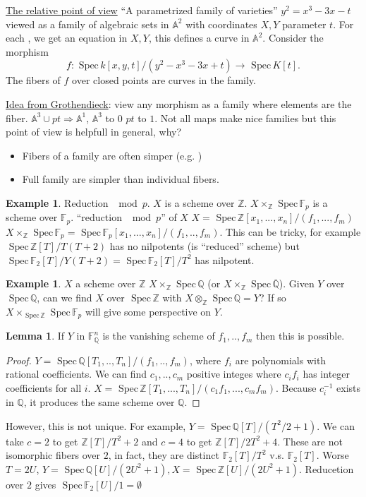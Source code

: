 \documentclass[11pt]{article}
\theoremstyle{definition}
\newtheorem{lemma}[thm]{Lemma}
\newtheorem{ex}[thm]{Example}
\newcommand{\spec}{\text{ Spec}\,}
\newcommand{\affn}{\mathbb A}
\newcommand{\intg}{\mathbb Z}
\newcommand{\bbf}{\mathbb F}
\newcommand{\ratl}{\mathbb Q}
\newcommand{\Lrta}{\Longrightarrow}
\newcommand{\lrta}{\longrightarrow}
\begin{document}
\underline{The relative point of view}
``A parametrized family of varieties''
$y^2=x^3-3x-t$ viewed as a family of algebraic sets in $\affn^2$ with coordinates $X,Y$ parameter $t$. For each %
, we get an equation in $X,Y$, this defines a curve in $\affn^2$. Consider the morphism
$$
f:\spec k[x,y,t]/(y^2-x^3-3x+t)\lrta \spec K[t].
$$
The fibers of $f$ over closed points are curves in the family.

\underline{Idea from Grothendieck}: view any morphism as a family where elements are the fiber. $\affn^3\cup pt\Lrta \affn^1$, $\affn^3$ to $0$ $pt$ to $1$. Not all maps make  nice families but this point of view is helpfull in general, why?
\begin{itemize}
	\item Fibers of a  family are often simper (e.g. )
	\item Full family are simpler than individual fibers.
\end{itemize}

\begin{ex}
Reduction $\mod p$. $X$ is a scheme over $\intg$. $X\times_\intg \spec \bbf_p$ is a scheme over $\bbf_p$. ``reduction $\mod p$'' of $X$
$X=\spec \intg[x_1,...,x_n]/(f_1,...,f_m)$
$X\times_\intg\spec \bbf_p=\spec \bbf_p[x_1,...,x_n]/(f_1,..,f_m)$. This can be tricky, for example $\spec \intg[T]/T(T+2)$ has no nilpotents (is ``reduced'' scheme) but $\spec \bbf_2[T]/Y(T+2)=\spec \bbf_2[T]/T^2$ has nilpotent. 
\end{ex}
\begin{ex}
$X$ a scheme over $\intg$
$X\times_\intg \spec \ratl$ (or $X\times_\intg \spec \overline{\ratl}$). Given $Y$ over $\spec \ratl$, can we find $X$ over $\spec \intg$ with $X\otimes_\intg \spec \ratl=Y$? If so $X\times_{\spec \intg} \spec \bbf_p$ will give some perspective on $Y$.
\end{ex}
\begin{lemma}
If $Y$ in $\bbf^n_\ratl$ is the vanishing scheme of $f_1,..,f_m$ then this is possible.
\end{lemma}
\begin{proof}
$Y=\spec \ratl[T_1,..,T_n]/(f_1,..,f_m)$, where $f_i$ are polynomials with rational coefficients. We can find $c_1,..,c_m$ positive integes where $c_if_i$ has integer coefficients for all $i$. $X=\spec \intg[T_1,...,T_n]/(c_1f_1,...,c_mf_m)$. Because $c_i^{-1}$ exists in $\ratl$, it produces the same scheme over $\ratl$. 

\end{proof}
However, this is not unique. For example, $Y=\spec \ratl[T]/(T^2/2+1)$. We can take $c=2$ to get $\intg[T]/T^2+2$ and $c=4$ to get $\intg[T]/2T^2+4$. These are not isomorphic fibers over $2$, in fact, they are distinct
$\bbf_2[T]/T^2$ v.s. $\bbf_2[T]$. Worse $T=2U$, $Y=\spec \ratl[U]/(2U^2+1), X=\spec \intg[U]/(2U^2+1)$. Reducetion over $2$ gives $\spec \bbf_2[U]/1=\emptyset$ 
\end{document}
